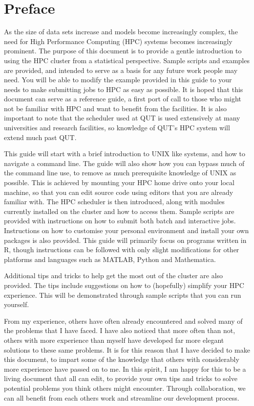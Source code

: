 \section*{Preface}
As the size of data sets increase and models become increasingly complex, the need for High Performance Computing (HPC) systems becomes increasingly prominent. The purpose of this document is to provide a gentle introduction to using the HPC cluster from a statistical perspective. Sample scripts and examples are provided, and intended to serve as a basis for any future work people may need. You will be able to modify the example provided in this guide to your needs to make submitting jobs to HPC as easy as possible. It is hoped that this document can serve as a reference guide, a first port of call to those who might not be familiar with HPC and want to benefit from the facilities. It is also important to note that the scheduler used at QUT is used extensively at many universities and research facilities, so knowledge of QUT's HPC system will extend much past QUT.
%
%
\par
%
%
This guide will start with a brief introduction to UNIX like systems, and how to navigate a command line. The guide will also show how you can bypass much of the command line use, to remove as much prerequisite knowledge of UNIX as possible. This is achieved by mounting your HPC home drive onto your local machine, so that you can edit source code using editors that you are already familiar with. The HPC scheduler is then introduced, along with modules currently installed on the cluster and how to access them. Sample scripts are provided with instructions on how to submit both batch and interactive jobs. Instructions on how to customise your personal environment and install your own packages is also provided. This guide will primarily focus on programs written in R, though instructions can be followed with only slight modifications for other platforms and languages such as MATLAB, Python and Mathematica.
%
%
\par
%
%
Additional tips and tricks to help get the most out of the cluster are also provided. The tips include suggestions on how to (hopefully) simplify your HPC experience. This will be demonstrated through sample scripts that you can run yourself.
%
%
\par
%
%
From my experience, others have often already encountered and solved many of the problems that I have faced. I have also noticed that more often than not, others with more experience than myself have developed far more elegant solutions to these same problems. It is for this reason that I have decided to make this document, to impart some of the knowledge that others with considerably more experience have passed on to me. In this spirit, I am happy for this to be a living document that all can edit, to provide your own tips and tricks to solve potential problems you think others might encounter. Through collaboration, we can all benefit from each others work and streamline our development process.
%
%
%
%
